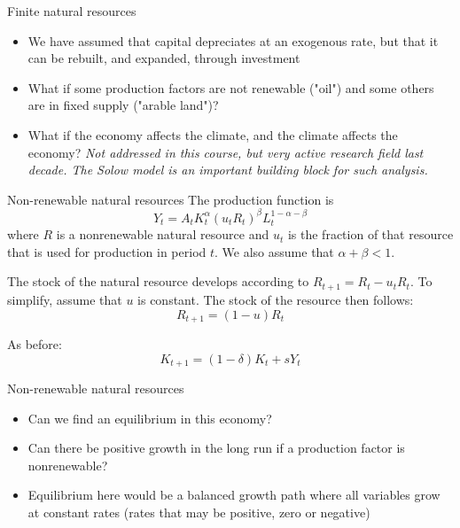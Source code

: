 \documentclass[10pt]{beamer}
\begin{document}
\begin{frame}{Finite natural resources}
\begin{itemize}
    \item We have assumed that capital depreciates at an exogenous rate, but that it can be rebuilt, and expanded, through investment\smallskip
    \item What if some production factors are not renewable ("oil") and some others are in fixed supply ("arable land")?\smallskip
    \item What if the economy affects the climate, and the climate affects the economy? \pause \emph{Not addressed in this course, but very active research field last decade. The Solow model is an important building block for such analysis.}
\end{itemize}
\end{frame}


\begin{frame}{Non-renewable natural resources}
    The production function is
    \begin{equation} \label{gYR}
        Y_t= A_t K_t^\alpha (u_tR_t)^\beta L_t^{1-\alpha-\beta}
    \end{equation}
    where $R$ is a nonrenewable natural resource and $u_t$ is the fraction of that resource that is used for production in period $t$. We also assume that $\alpha+\beta<1$. \medskip

    The stock of the natural resource develops according to $R_{t+1}=R_t-u_tR_t$. To simplify, assume that $u$ is constant. The stock of the resource then follows:
    \begin{equation*}
        R_{t+1}=(1-u)R_t
    \end{equation*}\medskip

    As before:
    \begin{equation} \label{Kprime5}
        K_{t+1}=(1-\delta)K_t + sY_t
    \end{equation}
\end{frame}


\begin{frame}{Non-renewable natural resources}
\begin{itemize}
    \item Can we find an equilibrium in this economy?\smallskip
    \item Can there be positive growth in the long run if a production factor is nonrenewable?
    \pause
    \bigskip
    \item Equilibrium here would be a balanced growth path where all variables grow at constant rates (rates that may be positive, zero or negative)
\end{itemize}
\end{frame}
\end{document}
